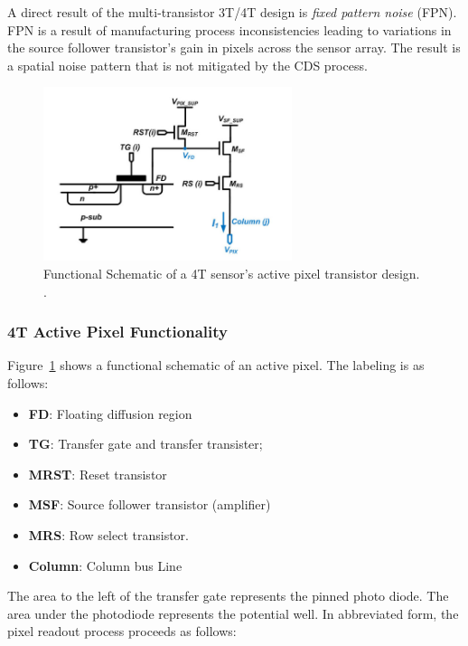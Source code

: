 \documentclass[10pt]{article}
\begin{document}
A direct result of the multi-transistor 3T/4T design is \emph{fixed pattern noise} (FPN). FPN is a result of manufacturing process inconsistencies leading to variations in the source follower transistor's gain in pixels across the sensor array. The result is a spatial noise pattern that is not mitigated by the CDS process. 

\begin{figure}[!b]
    \centering
        \includegraphics[height=2.0in]{APS Pixel Schematic.png}
    \caption{Functional Schematic of a 4T sensor's active pixel transistor design. \cite{xie19}.}
    \label{fig:PixelSchematic}
\end{figure}

\subsubsection{4T Active Pixel Functionality}

Figure~\ref{fig:PixelSchematic} shows a functional schematic of an active pixel. The labeling is as follows:

\begin{itemize}[noitemsep]
\item \textbf{FD}: Floating diffusion region
\item \textbf{TG}: Transfer gate and transfer transister;
\item \textbf{MRST}: Reset transistor
\item \textbf{MSF}: Source follower transistor (amplifier)
\item \textbf{MRS}: Row select transistor.
\item \textbf{Column}: Column bus Line
\end{itemize}

The area to the left of the transfer gate represents the pinned photo diode. The area under the photodiode represents the potential well. In abbreviated form, the pixel readout process proceeds as follows:
\end{document}
